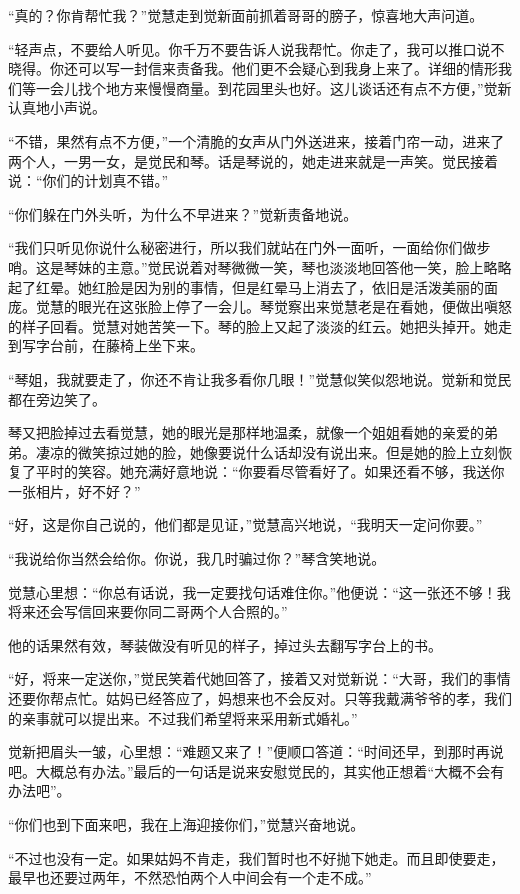 \par “真的？你肯帮忙我？”觉慧走到觉新面前抓着哥哥的膀子，惊喜地大声问道。
\par “轻声点，不要给人听见。你千万不要告诉人说我帮忙。你走了，我可以推口说不晓得。你还可以写一封信来责备我。他们更不会疑心到我身上来了。详细的情形我们等一会儿找个地方来慢慢商量。到花园里头也好。这儿谈话还有点不方便，”觉新认真地小声说。
\par “不错，果然有点不方便，”一个清脆的女声从门外送进来，接着门帘一动，进来了两个人，一男一女，是觉民和琴。话是琴说的，她走进来就是一声笑。觉民接着说：“你们的计划真不错。”
\par “你们躲在门外头听，为什么不早进来？”觉新责备地说。
\par “我们只听见你说什么秘密进行，所以我们就站在门外一面听，一面给你们做步哨。这是琴妹的主意。”觉民说着对琴微微一笑，琴也淡淡地回答他一笑，脸上略略起了红晕。她红脸是因为别的事情，但是红晕马上消去了，依旧是活泼美丽的面庞。觉慧的眼光在这张脸上停了一会儿。琴觉察出来觉慧老是在看她，便做出嗔怒的样子回看。觉慧对她苦笑一下。琴的脸上又起了淡淡的红云。她把头掉开。她走到写字台前，在藤椅上坐下来。
\par “琴姐，我就要走了，你还不肯让我多看你几眼！”觉慧似笑似怨地说。觉新和觉民都在旁边笑了。
\par 琴又把脸掉过去看觉慧，她的眼光是那样地温柔，就像一个姐姐看她的亲爱的弟弟。凄凉的微笑掠过她的脸，她像要说什么话却没有说出来。但是她的脸上立刻恢复了平时的笑容。她充满好意地说：“你要看尽管看好了。如果还看不够，我送你一张相片，好不好？”
\par “好，这是你自己说的，他们都是见证，”觉慧高兴地说，“我明天一定问你要。”
\par “我说给你当然会给你。你说，我几时骗过你？”琴含笑地说。
\par 觉慧心里想：“你总有话说，我一定要找句话难住你。”他便说：“这一张还不够！我将来还会写信回来要你同二哥两个人合照的。”
\par 他的话果然有效，琴装做没有听见的样子，掉过头去翻写字台上的书。
\par “好，将来一定送你，”觉民笑着代她回答了，接着又对觉新说：“大哥，我们的事情还要你帮点忙。姑妈已经答应了，妈想来也不会反对。只等我戴满爷爷的孝，我们的亲事就可以提出来。不过我们希望将来采用新式婚礼。”
\par 觉新把眉头一皱，心里想：“难题又来了！”便顺口答道：“时间还早，到那时再说吧。大概总有办法。”最后的一句话是说来安慰觉民的，其实他正想着“大概不会有办法吧”。
\par “你们也到下面来吧，我在上海迎接你们，”觉慧兴奋地说。
\par “不过也没有一定。如果姑妈不肯走，我们暂时也不好抛下她走。而且即使要走，最早也还要过两年，不然恐怕两个人中间会有一个走不成。”
